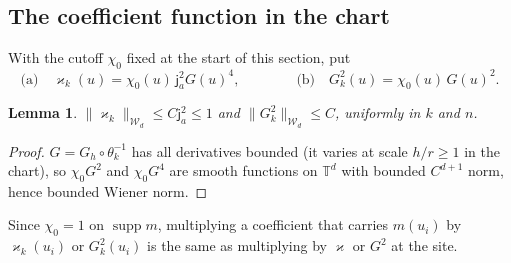 \documentclass[11pt]{article}
\newtheorem{lemma}[lemma]{Lemma}
\newcommand{\Torus}{\mathbb{T}}
\newcommand{\cW}{\mathcal{W}}
\newcommand{\norm}[1]{\lVert #1\rVert}
\newcommand{\ja}{\mathsf{j}_a}
\begin{document}
\subsection{The coefficient function in the chart}
With the cutoff \(\chi_0\) fixed at the start of this section, put
\begin{equation}
 \text{(a)}\quad \varkappa_k(u)=\chi_0(u)\,\ja^2G(u)^4,\qquad\qquad
 \text{(b)}\quad G_k^2(u)=\chi_0(u)\,G(u)^2 .
 \label{C:eq:coef-chart}
\end{equation}
\begin{lemma}\label{C:lem:coef-wiener}
\(\norm{\varkappa_k}_{\cW_d}\le C\ja^2\le1\) and \(\norm{G_k^2}_{\cW_d}\le C\),
uniformly in \(k\) and \(n\).
\end{lemma}
\begin{proof}
\(G=G_h\circ\theta_k^{-1}\) has all derivatives bounded (it varies at scale
\(h/r\ge1\) in the chart), so \(\chi_0G^2\) and \(\chi_0G^4\) are smooth
functions on \(\Torus^d\) with bounded \(C^{d+1}\) norm, hence bounded
Wiener norm.
\end{proof}
Since \(\chi_0=1\) on \(\operatorname{supp}m\), multiplying a coefficient
that carries \(m(u_i)\) by \(\varkappa_k(u_i)\) or \(G_k^2(u_i)\) is the same as
multiplying by \(\varkappa\) or \(G^2\) at the site.
\end{document}

